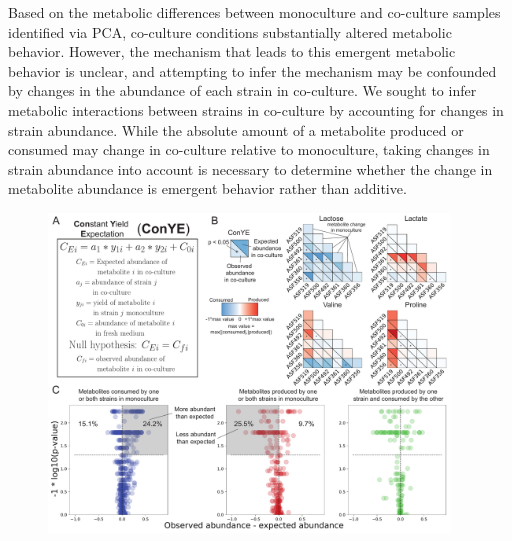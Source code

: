 \documentclass[11pt,twocolumn,notitlepage,openany,twoside]{book}
\begin{document}
\begin{refsection}
Based on the metabolic differences between monoculture and co-culture samples identified via PCA, co-culture conditions substantially altered metabolic behavior. However, the mechanism that leads to this emergent metabolic behavior is unclear, and attempting to infer the mechanism may be confounded by changes in the abundance of each strain in co-culture. We sought to infer metabolic interactions between strains in co-culture by accounting for changes in strain abundance. While the absolute amount of a metabolite produced or consumed may change in co-culture relative to monoculture, taking changes in strain abundance into account is necessary to determine whether the change in metabolite abundance is emergent behavior rather than additive.

\begin{figure}[tb!]
\centering
\includegraphics[width=0.95\textwidth]{ch2_fig4}

\end{figure}
\end{refsection}
\end{document}
